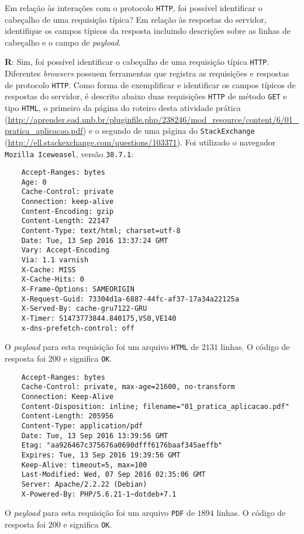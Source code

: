 Em relação às interações com o protocolo \texttt{HTTP}, foi possível identificar o cabeçalho de uma requisição típica? Em relação às respostas do servidor, identifique os campos típicos da resposta incluindo descrições sobre as linhas de cabeçalho e o campo de \emph{payload}.

\indent \textbf{R}: Sim, foi possível identificar o cabeçalho de uma requisição típica \texttt{HTTP}. Diferentes \emph{browsers} possuem ferramentas que registra as requisições e respostas de protocolo \texttt{HTTP}. Como forma de exemplificar e identificar os campos típicos de respostas do servidor, é descrito abaixo duas requisições \texttt{HTTP} de método \texttt{GET} e tipo \texttt{HTML}, o primeiro da página do roteiro desta atividade prática (\url{http://aprender.ead.unb.br/pluginfile.php/238246/mod_resource/content/6/01_pratica_aplicacao.pdf}) e o segundo de uma página do \texttt{StackExchange} (\url{http://ell.stackexchange.com/questions/103371}). Foi utilizado o navegador \texttt{Mozilla Iceweasel}, versão \texttt{38.7.1}:

\begin{lstlisting}
	Accept-Ranges: bytes
	Age: 0
	Cache-Control: private
	Connection: keep-alive
	Content-Encoding: gzip
	Content-Length: 22147
	Content-Type: text/html; charset=utf-8
	Date: Tue, 13 Sep 2016 13:37:24 GMT
	Vary: Accept-Encoding
	Via: 1.1 varnish
	X-Cache: MISS
	X-Cache-Hits: 0
	X-Frame-Options: SAMEORIGIN
	X-Request-Guid: 73304d1a-6887-44fc-af37-17a34a22125a
	X-Served-By: cache-gru7122-GRU
	X-Timer: S1473773844.840175,VS0,VE140
	x-dns-prefetch-control: off
\end{lstlisting}

O \emph{payload} para esta requisição foi um arquivo \texttt{HTML} de $2131$ linhas. O código de resposta foi $200$ e significa \texttt{OK}.

\begin{lstlisting}
	Accept-Ranges: bytes
	Cache-Control: private, max-age=21600, no-transform
	Connection: Keep-Alive
	Content-Disposition: inline; filename="01_pratica_aplicacao.pdf"
	Content-Length: 205956
	Content-Type: application/pdf
	Date: Tue, 13 Sep 2016 13:39:56 GMT
	Etag: "aa926467c375676a0690dfff6176baaf345aeffb"
	Expires: Tue, 13 Sep 2016 19:39:56 GMT
	Keep-Alive: timeout=5, max=100
	Last-Modified: Wed, 07 Sep 2016 02:35:06 GMT
	Server: Apache/2.2.22 (Debian)
	X-Powered-By: PHP/5.6.21-1~dotdeb+7.1
\end{lstlisting}

O \emph{payload} para esta requisição foi um arquivo \texttt{PDF} de $1894$ linhas. O código de resposta foi $200$ e significa \texttt{OK}.

